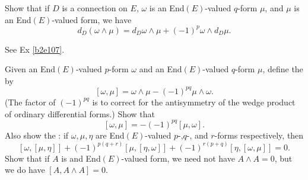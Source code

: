 \documentclass[10pt]{article}
\begin{document}
\begin{example}\label{b2e111}
	Show that if $D$ is a connection on $E$, $\omega$ is an End$(E)$-valued $q$-form $\mu$, and $\mu$ is an End$(E)$-valued form, we have
	$$
	d_D(\omega\wedge\mu) = d_D\omega\wedge\mu + (-1)^p\omega\wedge d_D\mu.
	$$
\end{example}
\sol See Ex \ref{b2e107}.


\begin{example}\label{b2e112}
	Given an End$(E)$-valued $p$-form $\omega$ and an End$(E)$-valued $q$-form $\mu$, define the  by
	$$
	[\omega,\mu] = \omega \wedge \mu - (-1)^{pq} \mu \wedge \omega.
	$$
	(The factor of $(-1)^{pq}$ is to correct for the antisymmetry of the wedge product of ordinary differential forms.) Show that
	$$
	[\omega,\mu] = -(-1)^{pq} [\mu, \omega].
	$$
	Also show the : if $\omega,\mu,\eta$ are End$(E)$-valued $p$-,$q$-, and $r$-forms respectively, then
	$$
	[\omega,[\mu,\eta]]+(-1)^{p(q+r)}[\mu,[\eta,\omega]]+(-1)^{r(p+q)}[\eta,[\omega,\mu]]=0.
	$$
	Show that if $A$ is and End$(E)$-valued form, we need not have $A \wedge A=0$, but we do have $[A,A \wedge A]=0$.
\end{example}
\sol 
\end{document}
